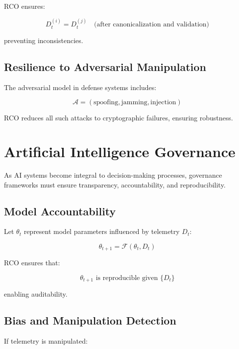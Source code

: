 RCO ensures:

\begin{equation}
D_t^{(i)} = D_t^{(j)} \quad \text{(after canonicalization and validation)}
\end{equation}

preventing inconsistencies.

\subsection{Resilience to Adversarial Manipulation}

The adversarial model in defense systems includes:

\begin{equation}
\mathcal{A} = (\text{spoofing}, \text{jamming}, \text{injection})
\end{equation}

RCO reduces all such attacks to cryptographic failures, ensuring robustness.

\section{Artificial Intelligence Governance}

As AI systems become integral to decision-making processes, governance frameworks must ensure transparency, accountability, and reproducibility.

\subsection{Model Accountability}

Let $\theta_t$ represent model parameters influenced by telemetry $D_t$:

\begin{equation}
\theta_{t+1} = \mathcal{F}(\theta_t, D_t)
\end{equation}

RCO ensures that:

\begin{equation}
\theta_{t+1} \text{ is reproducible given } \{D_t\}
\end{equation}

enabling auditability.

\subsection{Bias and Manipulation Detection}

If telemetry is manipulated:

